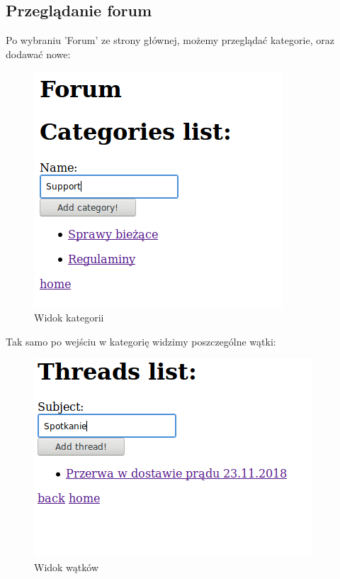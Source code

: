 \documentclass[12pt]{article}
\begin{document}
\subsection{Przeglądanie forum}
Po wybraniu 'Forum' ze strony głównej, możemy przeglądać kategorie, oraz dodawać nowe:
\begin{figure}[H]
	\centering
	\includegraphics[scale=0.7]{img/10.png}
	\caption{Widok kategorii}
\end{figure}
Tak samo po wejściu w kategorię widzimy poszczególne wątki:
\begin{figure}[H]
	\centering
	\includegraphics[scale=0.7]{img/11.png}
	\caption{Widok wątków}
\end{figure}
\end{document}
